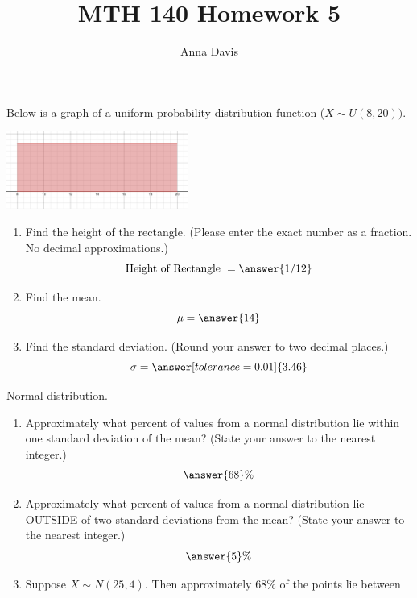 \documentclass{ximera}
\author{Anna Davis} \title{MTH 140 Homework 5}
\begin{document}
\begin{abstract}

\end{abstract}
\maketitle
 \begin{problem}\label{prob:140hom4prob6}
Below is a graph of a uniform probability distribution function ($X\sim U(8,20))$.  
\begin{image}
   
\includegraphics[height=1in]{140H4pic3.jpg}~
 
\end{image}
\begin{enumerate}
    \item Find the height of the rectangle. (Please enter the exact number as a fraction.  No decimal approximations.)
    $$\mbox{Height of Rectangle }=\answer{1/12}$$
    \item Find the mean.
    $$\mu=\answer{14}$$
    \item Find the standard deviation. (Round your answer to two decimal places.)
    $$\sigma=\answer[tolerance=0.01]{3.46}$$
\end{enumerate}

\end{problem}
 
 
 
 
 
\begin{problem}\label{prob:140hom5prob1}
Normal distribution.
\begin{enumerate} 
\item
Approximately what percent of values from a normal distribution lie within one standard deviation of the mean? (State your answer to the nearest integer.)
$$\answer{68}\%$$
\item Approximately what percent of values from a normal distribution lie OUTSIDE of two standard deviations from the mean?  (State your answer to the nearest integer.)
$$\answer{5}\%$$
\item Suppose $X\sim N(25, 4)$.  Then approximately 68\% of the points lie between 

\end{enumerate}

\end{problem}
\end{document}
